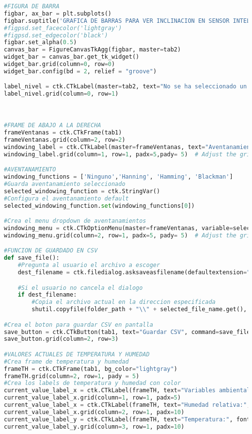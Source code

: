 \begin{lstlisting}[language=Python, caption=Código para interfaz gráfica de control y monitoreo]
#FIGURA DE BARRA
figbar, ax_bar = plt.subplots()
figbar.suptitle('GRAFICA DE BARRAS PARA VER INCLINACION EN SENSOR INTELIGENTE', fontsize=10, fontweight='bold')
#figpsd.set_facecolor('lightgray')
#figpsd.set_edgecolor('black')
figbar.set_alpha(0.5)
canvas_bar = FigureCanvasTkAgg(figbar, master=tab2)
widget_bar = canvas_bar.get_tk_widget()
widget_bar.grid(column=0, row=0)
widget_bar.config(bd = 2, relief = "groove")

label_nivel = ctk.CTkLabel(master=tab2, text="No se ha seleccionado un archivo.", font=("Arial", 14, "bold"))
label_nivel.grid(column=0, row=1)



#FRAME DE ABAJO A LA DERECHA
frameVentanas = ctk.CTkFrame(tab1)
frameVentanas.grid(column=2, row=2)
windowing_label = ctk.CTkLabel(master=frameVentanas, text="Aventanamiento")
windowing_label.grid(column=1, row=1, padx=5,pady= 5)  # Adjust the grid position as needed

#AVENTANAMIENTO
windowing_functions = ['Ninguno','Hanning', 'Hamming', 'Blackman']
#Guarda aventanamiento seleccionado
selected_windowing_function = ctk.StringVar()
#Configura el aventanamiento default
selected_windowing_function.set(windowing_functions[0])

#Crea el menu dropdown de aventanamientos
windowing_menu = ctk.CTkOptionMenu(master=frameVentanas, variable=selected_windowing_function, values=windowing_functions)
windowing_menu.grid(column=2, row=1, padx=5, pady= 5)  # Adjust the grid position as needed

#FUNCION DE GUARDADO EN CSV
def save_file():
    #Pregunta al usuario el archivo a escoger
    dest_filename = ctk.filedialog.asksaveasfilename(defaultextension=".csv")

    #Si el usuario no cancela el dialogo
    if dest_filename:
        #Copia el archivo actual en la direccion especificada
        shutil.copyfile(folder_path + "\\" + selected_file_name.get(), dest_filename)

#Crea el boton para guardar CSV en pantalla
save_button = ctk.CTkButton(tab1, text="Guardar CSV", command=save_file)
save_button.grid(column=2, row=3)

#VALORES ACTUALES DE TEMPERATURA Y HUMEDAD
#Crea frame de temperatura y humedad
frameTH = ctk.CTkFrame(tab1, bg_color="lightgray")
frameTH.grid(column=2, row=1, pady = 5)
#Crea los labels de temperatura y humedad con color
current_value_label_x = ctk.CTkLabel(frameTH, text="Variables ambientales:", font=("Arial", 14, "bold"))
current_value_label_x.grid(column=1, row=1, padx=5)
current_value_label_x = ctk.CTkLabel(frameTH, text="Humedad relativa:", font=("Arial", 14, "bold"), corner_radius=50, fg_color="darkgray")
current_value_label_x.grid(column=2, row=1, padx=10)
current_value_label_y = ctk.CTkLabel(frameTH, text="Temperatura:", font=("Arial", 14, "bold"), corner_radius=50, fg_color="darkgray")
current_value_label_y.grid(column=3, row=1, padx=10)


\end{lstlisting}
